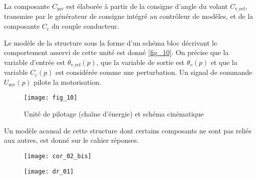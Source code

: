 La composante $C_{\text{mv}}$ est élaborée à partir de la consigne d'angle du volant $C_{\text{v\_ref}}$, transmise par le
générateur de consigne intégré au contrôleur de modèles, et de la composante $C_c$ du couple
conducteur.

Le modèle de la structure sous la forme d'un schéma bloc décrivant le comportement asservi de cette
unité est donné \autoref{fig_10}. On précise que la variable d'entrée est $\theta_{\text{v\_ref}}(p)$, que la variable de sortie est $\theta_{v}(p)$ et que la variable $C_c(p)$ est considérée comme une perturbation. Un signal de commande $U_{\text{mv}}(p)$ pilote la motorisation.



\begin{figure}[H]
\centering
\texttt{[image: fig\_10]}

\caption{Unité de pilotage (chaîne d'énergie) et schéma cinématique  \label{fig_10}}
\end{figure}

Un modèle acausal de cette structure dont certains composants ne sont pas reliés aux autres, est
donné sur le cahier réponses.

\fi

\ifprof
\begin{corrige}
\begin{figure}[H]
\centering
\texttt{[image: cor\_02\_bis]}
\end{figure}
\end{corrige}
\else
\fi



\ifprof
\else
\begin{figure}[H]
\centering
\texttt{[image: dr\_01]}
\end{figure}
\fi